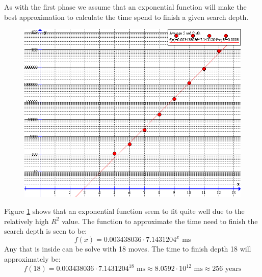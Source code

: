 As with the first phase we assume that an exponential function will make the best approximation to calculate the time spend to finish a given search depth.

\begin{figure}[htb]
	\centering
		\includegraphics[scale=0.5]{input/pics/timeFunction2}
	\caption{}
	\label{fig:timeFunction2}
\end{figure}
Figure \ref{fig:timeFunction2} shows that an exponential function seem to fit quite well due to the relatively high $R^2$ value.
The function to approximate the time need to finish the search depth is seen to be:
\[
f(x) = 0.003438036 \cdot 7.1431204^{x} \text{ ms}
\]
Any \rubik{} that is inside  can be solve with 18  moves.
The time to finish depth 18 will approximately be:
\[
f(18) = 0.003438036 \cdot 7.1431204^{18} \text{ ms} \approx 8.0592 \cdot 10^{12} \text{ ms} \approx 256 \text{ years}
\]